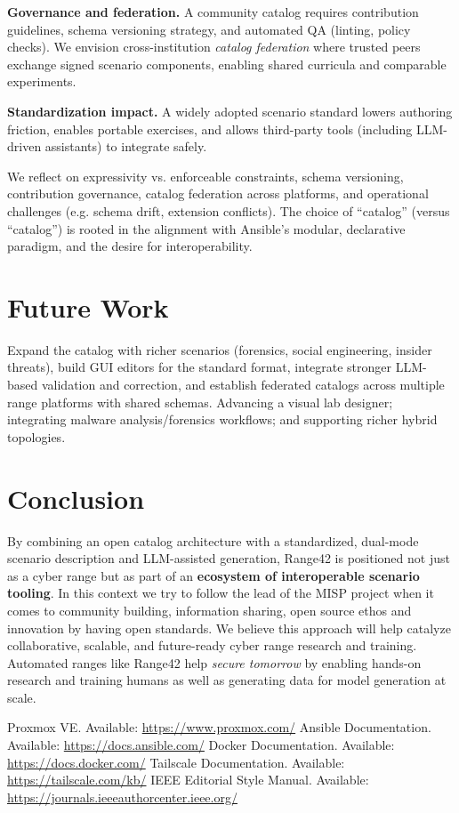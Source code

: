\documentclass[11pt]{article}
\begin{document}
\textbf{Governance and federation.} A community catalog requires contribution guidelines, schema versioning strategy, and automated QA (linting, policy checks). 
We envision cross-institution \emph{catalog federation} where trusted peers exchange signed scenario components, enabling shared curricula and comparable experiments.

\textbf{Standardization impact.} A widely adopted scenario standard lowers authoring friction, enables portable exercises, and allows third-party tools (including LLM-driven assistants) to integrate safely.

We reflect on expressivity vs. enforceable constraints, schema versioning, contribution governance, catalog federation across platforms, and operational challenges (e.g. schema drift, extension conflicts). The choice of “catalog” (versus “catalog”) is rooted in the alignment with Ansible’s modular, declarative paradigm, and the desire for interoperability.

\section{Future Work}
Expand the catalog with richer scenarios (forensics, social engineering, insider threats), build GUI editors for the standard format, integrate stronger LLM-based validation and correction, and establish federated catalogs across multiple range platforms with shared schemas. Advancing a visual lab designer; integrating malware analysis/forensics workflows; and supporting richer hybrid topologies.

\section{Conclusion}
By combining an open catalog architecture with a standardized, dual-mode scenario description and LLM-assisted generation, Range42 is positioned not just as a cyber range but as part of an \textbf{ecosystem of interoperable scenario tooling}. In this context we try to follow the lead of the MISP project when it comes to community building, information sharing, open source ethos and innovation by having open standards.
We believe this approach will help catalyze collaborative, scalable, and future-ready cyber range research and training.
Automated ranges like Range42 help \emph{secure tomorrow} by enabling hands-on research and training humans as well as generating data for model generation at scale. 


\begin{thebibliography}{99}
 Proxmox VE. Available: \url{https://www.proxmox.com/}
 Ansible Documentation. Available: \url{https://docs.ansible.com/}
 Docker Documentation. Available: \url{https://docs.docker.com/}
 Tailscale Documentation. Available: \url{https://tailscale.com/kb/}
 IEEE Editorial Style Manual. Available: \url{https://journals.ieeeauthorcenter.ieee.org/}
\end{thebibliography}
\end{document}
